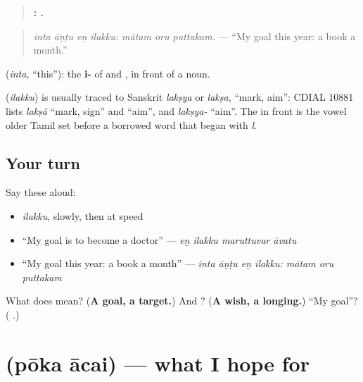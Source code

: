 \begin{quote}
\textbf{   :   .}
\end{quote}

\begin{quote}
\emph{inta āṇṭu eṉ ilakku: mātam oru puttakam.} — \textquotedblleft{}My goal this year: a book a month.\textquotedblright{}
\end{quote}

\textbf{} (\emph{inta}, \textquotedblleft{}this\textquotedblright{}): the \textbf{i-} of \textbf{} and \textbf{}, in front of a noun.

\begin{cousinweb}
\textbf{} (\emph{ilakku}) is usually traced to Sanskrit \emph{lakṣya} or \emph{lakṣa}, \textquotedblleft{}mark, aim\textquotedblright{}: CDIAL 10881 lists \emph{lakṣá} \textquotedblleft{}mark, sign\textquotedblright{} and \textquotedblleft{}aim\textquotedblright{}, and \emph{lakṣya-} \textquotedblleft{}aim\textquotedblright{}. The \textbf{} in front is the vowel older Tamil set before a borrowed word that began with \emph{l}.
\end{cousinweb}

\subsection*{Your turn}
Say these aloud:

\begin{itemize}
\raggedright
  \item \emph{ilakku}, slowly, then at speed
  \item \textquotedblleft{}My goal is to become a doctor\textquotedblright{} — \emph{eṉ ilakku maruttuvar āvatu}
  \item \textquotedblleft{}My goal this year: a book a month\textquotedblright{} — \emph{inta āṇṭu eṉ ilakku: mātam oru puttakam}
\end{itemize}

\begin{tcolorbox}[breakable,colback=teal!4,colframe=teal!35!black,title={Before you move on}]
What does \textbf{} mean? (\textbf{A goal, a target.}) And \textbf{}? (\textbf{A wish, a longing.}) \textquotedblleft{}My goal\textquotedblright{}? (\textbf{ }.)
\end{tcolorbox}
\section[\texorpdfstring{\ta{போக} \ta{ஆசை} (pōka ācai)}{போக ஆசை (pōka ācai)}]{  (pōka ācai) — what I hope for}

